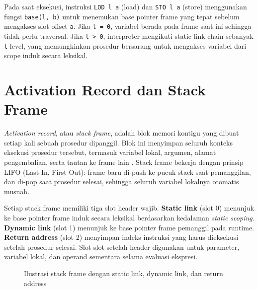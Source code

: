 Pada saat eksekusi, instruksi \texttt{LOD l a} (load) dan \texttt{STO l a} (store) menggunakan fungsi \texttt{base(l, b)} untuk menemukan base pointer frame yang tepat sebelum mengakses slot offset \texttt{a}. Jika \texttt{l = 0}, variabel berada pada frame saat ini sehingga tidak perlu traversal. Jika \texttt{l > 0}, interpreter mengikuti static link chain sebanyak \texttt{l} level, yang memungkinkan prosedur bersarang untuk mengakses variabel dari scope induk secara leksikal.


\section{Activation Record dan Stack Frame}

\textit{Activation record}, atau \textit{stack frame}, adalah blok memori kontigu yang dibuat setiap kali sebuah prosedur dipanggil. Blok ini menyimpan seluruh konteks eksekusi prosedur tersebut, termasuk variabel lokal, argumen, alamat pengembalian, serta tautan ke frame lain \cite{aho2007compilers}. Stack frame bekerja dengan prinsip LIFO (Last In, First Out): frame baru di-push ke pucuk stack saat pemanggilan, dan di-pop saat prosedur selesai, sehingga seluruh variabel lokalnya otomatis musnah.

Setiap stack frame memiliki tiga slot header wajib. \textbf{Static link} (slot 0) menunjuk ke base pointer frame induk secara leksikal berdasarkan kedalaman \textit{static scoping}. \textbf{Dynamic link} (slot 1) menunjuk ke base pointer frame pemanggil pada runtime. \textbf{Return address} (slot 2) menyimpan indeks instruksi yang harus dieksekusi setelah prosedur selesai. Slot-slot setelah header digunakan untuk parameter, variabel lokal, dan operand sementara selama evaluasi ekspresi.

\begin{figure}[H]
    \centering
    \caption{Ilustrasi stack frame dengan static link, dynamic link, dan return address}
    \label{fig:stack-frame}
\end{figure}

